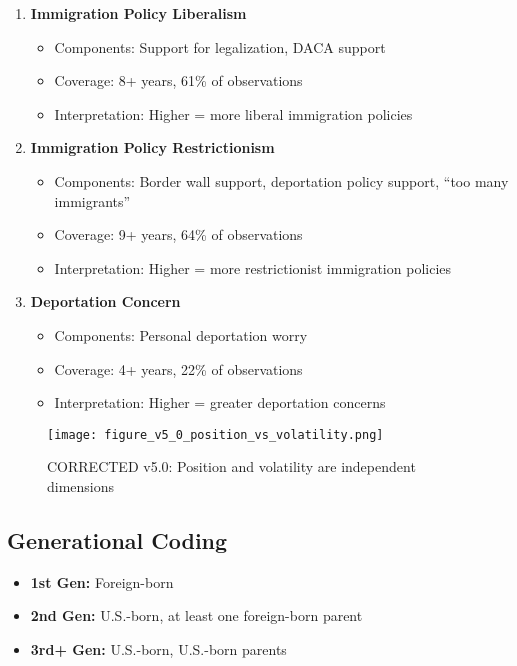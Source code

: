 \documentclass[11pt,letterpaper]{article}
\newcommand{\compactdesc}[2]{\item \textbf{#1:} #2}
\begin{document}
\begin{enumerate}
    \item \textbf{Immigration Policy Liberalism}
        \begin{itemize}
            \item Components: Support for legalization, DACA support
            \item Coverage: 8+ years, 61\% of observations
            \item Interpretation: Higher = more liberal immigration policies
        \end{itemize}
        
    \item \textbf{Immigration Policy Restrictionism}
        \begin{itemize}
            \item Components: Border wall support, deportation policy support, ``too many immigrants''
            \item Coverage: 9+ years, 64\% of observations
            \item Interpretation: Higher = more restrictionist immigration policies
        \end{itemize}
        
    \item \textbf{Deportation Concern}
        \begin{itemize}
            \item Components: Personal deportation worry
            \item Coverage: 4+ years, 22\% of observations
            \item Interpretation: Higher = greater deportation concerns
        \end{itemize}
\end{enumerate}

\begin{figure}[H]
    \centering
    \texttt{[image: figure\_v5\_0\_position\_vs\_volatility.png]}
    \caption{CORRECTED v5.0: Position and volatility are independent dimensions}
    \label{fig:dimensions}
\end{figure}

\subsection{Generational Coding}
\begin{itemize}
    \compactdesc{1st Gen}{Foreign-born}
    \compactdesc{2nd Gen}{U.S.-born, at least one foreign-born parent}
    \compactdesc{3rd+ Gen}{U.S.-born, U.S.-born parents}
\end{itemize}
\end{document}

